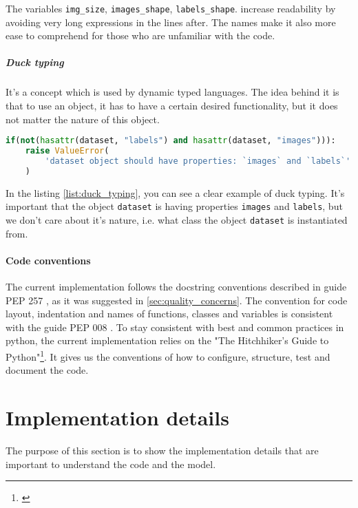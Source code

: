 The variables \lstinline{img_size}, \lstinline{images_shape}, \lstinline{labels_shape}.
increase readability by avoiding very long expressions in the lines after.
The names make it also more ease to comprehend for those who are unfamiliar
with the code.

\subparagraph{Duck typing} It's a concept which is used by dynamic typed languages.
The idea behind it is that to use an object, it has to have a certain desired functionality,
but it does not matter the nature of this object.
\begin{lstlisting}[language=Python, caption={Method comment example},label={list:duck_typing}]
if(not(hasattr(dataset, "labels") and hasattr(dataset, "images"))):
	raise ValueError(
		'dataset object should have properties: `images` and `labels`'
	)
\end{lstlisting}

In the listing \ref{list:duck_typing}, you can see a clear example of duck typing.
It's important that the object \lstinline{dataset} is having properties
\lstinline{images} and \lstinline{labels}, but we don't care about it's nature,
i.e. what class the object \lstinline{dataset} is instantiated from.

\paragraph{Code conventions} The current implementation follows the
docstring conventions described in guide PEP 257 \cite{Goodger2001}, as it was
suggested in \autoref{sec:quality_concerns}. The convention for code layout,
indentation and names of functions, classes and variables is consistent with
the guide PEP 008 \cite{Rossum}. To stay consistent with best and common practices
in python, the current implementation relies on the
"The Hitchhiker’s Guide to Python"\footnote{\cite{Reitz}}. It gives us
the conventions of how to configure, structure, test and document the code.

\section{Implementation details}
The purpose of this section is to show the implementation details that
are important to understand the code and the model.

